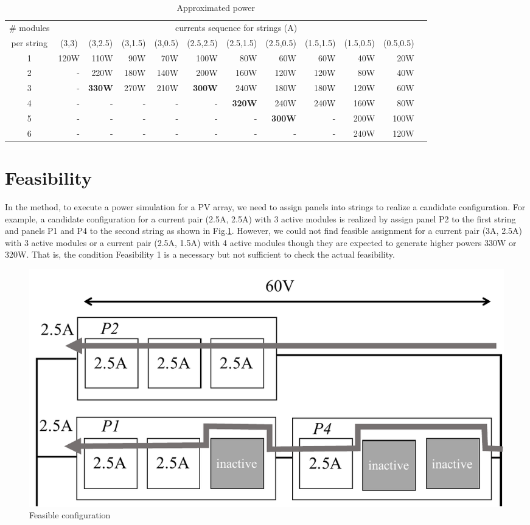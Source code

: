 \documentclass[conference]{pvsctran}
\begin{document}
\begin{table}[t]
\caption{Approximated power}
\label{tab:powers}
\centering
\begin{tabular}{c|rrrrrrrrrrr}
\hline\hline	
\# modules & 	\multicolumn{10}{c}{currents sequence for strings (A)} \\ 																
per string		&	\multicolumn{1}{c}{(3,3)}	&	\multicolumn{1}{c}{(3,2.5)}	&	\multicolumn{1}{c}{(3,1.5)}	&	\multicolumn{1}{c}{(3,0.5)}	&	\multicolumn{1}{c}{(2.5,2.5)}	&	\multicolumn{1}{c}{(2.5,1.5)}	&	\multicolumn{1}{c}{(2.5,0.5)}	&	\multicolumn{1}{c}{(1.5,1.5)}	&	\multicolumn{1}{c}{(1.5,0.5)}	&	\multicolumn{1}{c}{(0.5,0.5)}	\\ \hline
	1	&	120W	&	110W	&	90W	&	70W	&	100W	&	80W	&	60W	&	60W	&	40W	&	20W	\\ \hline
	2	&	-	&	220W	&	180W	&	140W	&	200W	&	160W	&	120W	&	120W	&	80W	&	40W	\\ \hline	3	&	-	&\textbf{330W}&	270W	&	210W	&	\textbf{300W}	&	240W	&	180W	&	180W	&	120W	&	60W	\\ \hline
4	&	-	&	-	&	-	&	-	&	-	&	\textbf{320W}	&	240W	&	240W	&	160W	&	80W	\\ \hline
	 5	&	-	&	-	&	-	&	-	&	-	&	-	&	\textbf{300W}	&	-	&	200W	&	100W	\\ \hline
	6	&	-	&	-	&	-	&	-	&	-	&	-	&	-	&	-	&	240W	&	120W	\\ \hline
\end{tabular}
\end{table}

\section{Feasibility}
In the method\cite{orozco2016optimized}, to execute a power simulation for a PV array, we need to assign panels into strings to realize a candidate configuration. 
For example, a candidate configuration for a current pair (2.5A, 2.5A) with 3 active modules is realized by assign panel P2  to the first string and panels P1 and P4 to the second string as shown in Fig.\ref{fig:feasible-configuration}. 
However, we could not find feasible assignment for a current pair (3A, 2.5A) with 3 active modules or a current pair (2.5A, 1.5A) with 4 active modules though they are expected to generate higher powers 330W or 320W. 
That is, the condition Feasibility 1 is a necessary but not sufficient to check the actual feasibility.

\begin{figure}[t]
    \centering
    \includegraphics[width=0.8\linewidth]{../fig/feasible-configuration.pdf}
    \caption{Feasible configuration}
    \label{fig:feasible-configuration}
\end{figure}
\end{document}
